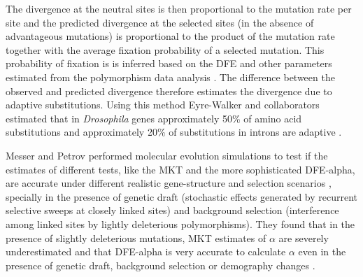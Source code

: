 The divergence at the neutral sites is then proportional to the mutation rate per site and the predicted divergence at the selected sites (in the absence of advantageous mutations) is proportional to the product of the mutation rate together with the average fixation probability of a selected mutation.
This probability of fixation is is inferred based on the DFE and other parameters estimated from the polymorphism data analysis \citep{Eyre-Walker2009}.
The difference between the observed and predicted divergence therefore estimates the divergence due to adaptive substitutions.
%
Using this method Eyre-Walker and collaborators estimated that in \textit{Drosophila} genes approximately 50\% of amino acid substitutions and approximately 20\% of substitutions in introns are adaptive \citep{Eyre-Walker2009}.

Messer and Petrov performed molecular evolution simulations to test if the estimates of different tests, like the MKT and the more sophisticated DFE-alpha, are accurate under different realistic gene-structure and selection scenarios \citep{Messer2013}, specially in the presence of genetic draft (stochastic effects generated by recurrent selective sweeps at closely linked sites)
and background selection (interference among linked sites by lightly deleterious polymorphisms).
%
They found that in the presence of slightly deleterious mutations, MKT estimates of $\alpha$ are severely underestimated and that DFE-alpha is very accurate to calculate $\alpha$ even in the presence of genetic draft, background selection or demography changes \citep{Messer2013}.
%

